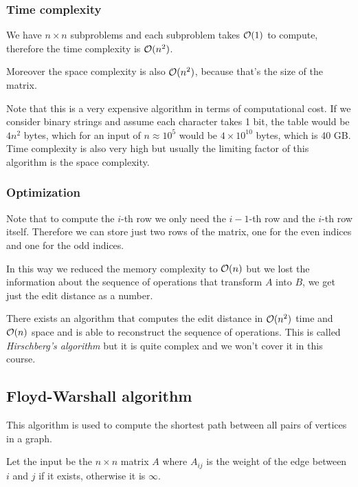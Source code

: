 \documentclass[12pt]{extarticle}
\begin{document}
\subsubsection{Time complexity}

We have $n \times n$ subproblems and each subproblem takes $\mathcal{O}(1)$ to compute, therefore the time complexity is $\mathcal{O}(n^2)$.

Moreover the space complexity is also $\mathcal{O}(n^2)$, because that's the size of the matrix.

Note that this is a very expensive algorithm in terms of computational cost. If we consider binary strings and assume each character takes 1 bit, the table would be $4 n^2 $ bytes, which for an input of $n \approx 10^5$ would be $4 \times 10^{10}$ bytes, which is 40 GB.
Time complexity is also very high but usually the limiting factor of this algorithm is the space complexity.

\subsubsection{Optimization}

Note that to compute the $i$-th row we only need the $i-1$-th row and the $i$-th row itself.
Therefore we can store just two rows of the matrix, one for the even indices and one for the odd indices.

In this way we reduced the memory complexity to $\mathcal{O}(n)$ but we lost the information about the sequence of operations that transform $A$ into $B$, we get just the edit distance as a number.

\begin{remark}
    There exists an algorithm that computes the edit distance in $\mathcal{O}(n^2)$ time and $\mathcal{O}(n)$ space and is able to reconstruct the sequence of operations. This is called \emph{Hirschberg's algorithm} but it is quite complex and we won't cover it in this course.
\end{remark}

\subsection{Floyd-Warshall algorithm}

This algorithm is used to compute the shortest path between all pairs of vertices in a graph.

Let the input be the $n \times n$ matrix $A$ where $A_{ij}$ is the weight of the edge between $i$ and $j$ if it exists, otherwise it is $\infty$.
\end{document}
